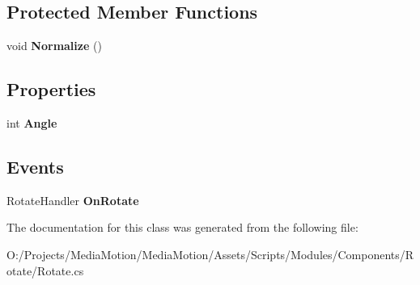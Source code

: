\subsection*{Protected Member Functions}
\begin{DoxyCompactItemize}
\item 
\hypertarget{class_media_motion_1_1_modules_1_1_components_1_1_rotate_1_1_rotate_a25abdd66879453b43741255769b3e5fc}{void {\bfseries Normalize} ()}\label{class_media_motion_1_1_modules_1_1_components_1_1_rotate_1_1_rotate_a25abdd66879453b43741255769b3e5fc}

\end{DoxyCompactItemize}
\subsection*{Properties}
\begin{DoxyCompactItemize}
\item 
\hypertarget{class_media_motion_1_1_modules_1_1_components_1_1_rotate_1_1_rotate_ab0c9c818f58e1c91f32fad2f1cd61713}{int {\bfseries Angle}}\label{class_media_motion_1_1_modules_1_1_components_1_1_rotate_1_1_rotate_ab0c9c818f58e1c91f32fad2f1cd61713}

\end{DoxyCompactItemize}
\subsection*{Events}
\begin{DoxyCompactItemize}
\item 
\hypertarget{class_media_motion_1_1_modules_1_1_components_1_1_rotate_1_1_rotate_adeb8e40753bc106c14c6044777c63a2e}{Rotate\+Handler {\bfseries On\+Rotate}}\label{class_media_motion_1_1_modules_1_1_components_1_1_rotate_1_1_rotate_adeb8e40753bc106c14c6044777c63a2e}

\end{DoxyCompactItemize}


The documentation for this class was generated from the following file\+:\begin{DoxyCompactItemize}
\item 
O\+:/\+Projects/\+Media\+Motion/\+Media\+Motion/\+Assets/\+Scripts/\+Modules/\+Components/\+Rotate/Rotate.\+cs\end{DoxyCompactItemize}
